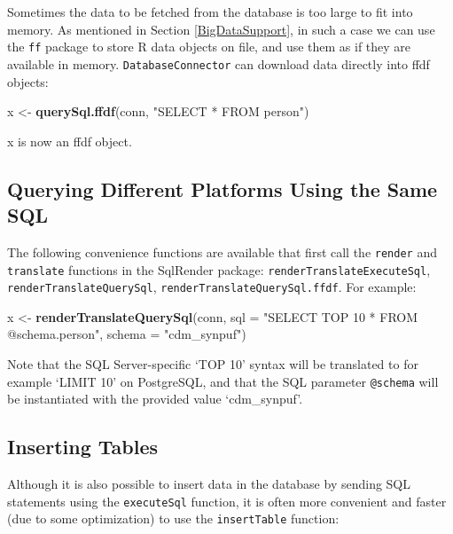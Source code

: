 \documentclass[11pt]{book}
\newenvironment{Shaded}{\begin{snugshade}}{\end{snugshade}}
\newcommand{\KeywordTok}[1]{\textcolor[rgb]{0.13,0.29,0.53}{\textbf{#1}}}
\newcommand{\DataTypeTok}[1]{\textcolor[rgb]{0.13,0.29,0.53}{#1}}
\newcommand{\StringTok}[1]{\textcolor[rgb]{0.31,0.60,0.02}{#1}}
\newcommand{\NormalTok}[1]{#1}
\theoremstyle{definition}
\theoremstyle{definition}
\theoremstyle{definition}
\theoremstyle{remark}
\begin{document}
Sometimes the data to be fetched from the database is too large to fit
into memory. As mentioned in Section \ref{BigDataSupport}, in such a
case we can use the \texttt{ff} package to store R data objects on file,
and use them as if they are available in memory.
\texttt{DatabaseConnector} can download data directly into ffdf objects:

\begin{Shaded}
\begin{Highlighting}[]
\NormalTok{x <-}\StringTok{ }\KeywordTok{querySql.ffdf}\NormalTok{(conn, }\StringTok{"SELECT * FROM person"}\NormalTok{)}
\end{Highlighting}
\end{Shaded}

x is now an ffdf object.

\subsection{Querying Different Platforms Using the Same
SQL}\label{querying-different-platforms-using-the-same-sql}

The following convenience functions are available that first call the
\texttt{render} and \texttt{translate} functions in the SqlRender
package: \texttt{renderTranslateExecuteSql},
\texttt{renderTranslateQuerySql}, \texttt{renderTranslateQuerySql.ffdf}.
For example:

\begin{Shaded}
\begin{Highlighting}[]
\NormalTok{x <-}\StringTok{ }\KeywordTok{renderTranslateQuerySql}\NormalTok{(conn, }
                             \DataTypeTok{sql =} \StringTok{"SELECT TOP 10 * FROM @schema.person"}\NormalTok{,}
                             \DataTypeTok{schema =} \StringTok{"cdm_synpuf"}\NormalTok{)}
\end{Highlighting}
\end{Shaded}

Note that the SQL Server-specific `TOP 10' syntax will be translated to
for example `LIMIT 10' on PostgreSQL, and that the SQL parameter
\texttt{@schema} will be instantiated with the provided value
`cdm\_synpuf'.

\subsection{Inserting Tables}\label{inserting-tables}

Although it is also possible to insert data in the database by sending
SQL statements using the \texttt{executeSql} function, it is often more
convenient and faster (due to some optimization) to use the
\texttt{insertTable} function:
\end{document}

